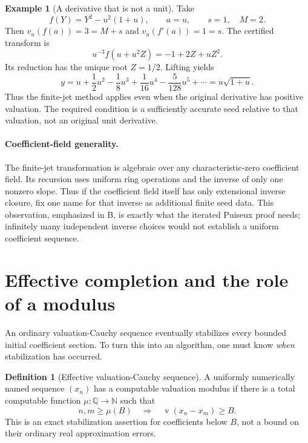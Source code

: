 \documentclass[11pt,letterpaper]{article}
\numberwithin{equation}{section}
\theoremstyle{definition}
\newtheorem{definition}[theorem]{Definition}
\newtheorem{example}[theorem]{Example}
\theoremstyle{remark}
\newcommand{\Q}{\mathbb Q}
\newcommand{\N}{\mathbb N}
\newcommand{\val}{\operatorname{v}}
\begin{document}
\begin{example}[A derivative that is not a unit]
Take
\[
 f(Y)=Y^2-u^2(1+u),\qquad a=u,
 \qquad s=1,\quad M=2.
\]
Then $v_u(f(a))=3=M+s$ and $v_u(f'(a))=1=s$. The certified transform is
\[
 u^{-3}f(u+u^2Z)=-1+2Z+uZ^2.
\]
Its reduction has the unique root $Z=1/2$. Lifting yields
\[
 y=u+\frac12u^2-\frac18u^3+\frac1{16}u^4
       -\frac5{128}u^5+\cdots=u\sqrt{1+u}.
\]
Thus the finite-jet method applies even when the original derivative has
positive valuation. The required condition is a sufficiently accurate seed
relative to that valuation, not an original unit derivative.
\end{example}


\paragraph{Coefficient-field generality.}
The finite-jet transformation is algebraic over any characteristic-zero
coefficient field. Its recursion uses uniform ring operations and the inverse
of only one nonzero slope. Thus if the coefficient field itself has only
extensional inverse closure, fix one name for that inverse as additional
finite seed data. This observation, emphasized in B, is exactly what the
iterated Puiseux proof needs; infinitely many independent inverse choices
would not establish a uniform coefficient sequence.

\section{Effective completion and the role of a modulus}
\label{sec:completion}

An ordinary valuation-Cauchy sequence eventually stabilizes every bounded
initial coefficient section. To turn this into an algorithm, one must know
\emph{when} stabilization has occurred.

\begin{definition}[Effective valuation-Cauchy sequence]
A uniformly numerically named sequence $(x_n)$ has a computable valuation
modulus if there is a total computable function $\mu:\Q\to\N$ such that
\begin{equation}\label{eq:modulus}
 n,m\ge\mu(B)\quad\Longrightarrow\quad
 \val(x_n-x_m)\ge B.
\end{equation}
This is an exact stabilization assertion for coefficients below $B$, not
a bound on their ordinary real approximation errors.
\end{definition}
\end{document}

